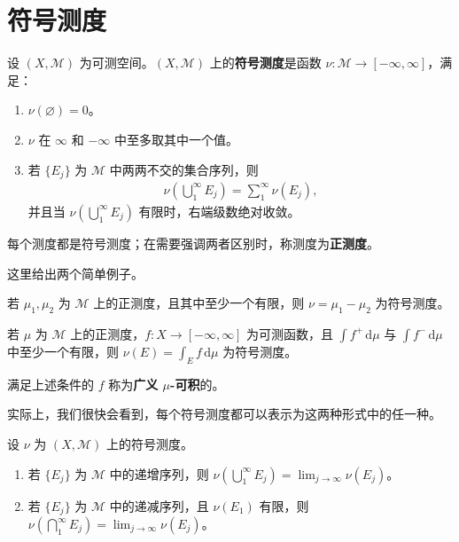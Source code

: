 \documentclass[../../main.tex]{subfiles}%
\begin{document}
\section{符号测度}\label{section:ch03-signed-measures}
\begin{definition}[符号测度]\label{definition:ch03-signed-measure}
设 $(X,\mathscr{M})$ 为可测空间。$(X,\mathscr{M})$ 上的\textbf{符号测度}是函数 $\nu:\mathscr{M}\to[-\infty,\infty]$，满足：
\begin{enumerate}
\item $\nu(\varnothing)=0$。
\item $\nu$ 在 $\infty$ 和 $-\infty$ 中至多取其中一个值。
\item 若 $\{E_j\}$ 为 $\mathscr{M}$ 中两两不交的集合序列，则
\begin{align*}
\nu\left(\bigcup_1^\infty E_j\right)=\sum_1^\infty\nu(E_j),
\end{align*}
并且当 $\nu(\bigcup_1^\infty E_j)$ 有限时，右端级数绝对收敛。
\end{enumerate}
\end{definition}
\begin{definition}[正测度]\label{definition:ch03-positive-measure}
每个测度都是符号测度；在需要强调两者区别时，称测度为\textbf{正测度}。
\end{definition}
这里给出两个简单例子。
\begin{example}\label{example:ch03-difference-measures}
若 $\mu_1,\mu_2$ 为 $\mathscr{M}$ 上的正测度，且其中至少一个有限，则 $\nu=\mu_1-\mu_2$ 为符号测度。
\end{example}
\begin{example}\label{example:ch03-signed-density}
若 $\mu$ 为 $\mathscr{M}$ 上的正测度，$f:X\to[-\infty,\infty]$ 为可测函数，且 $\int f^+\,\mathrm{d}\mu$ 与 $\int f^-\,\mathrm{d}\mu$ 中至少一个有限，则 $\nu(E)=\int_E f\,\mathrm{d}\mu$ 为符号测度。
\begin{definition*}[广义可积]
满足上述条件的 $f$ 称为\textbf{广义 $\mu$-可积}的。
\end{definition*}
\end{example}
实际上，我们很快会看到，每个符号测度都可以表示为这两种形式中的任一种。
\begin{proposition}\label{proposition:ch03-signed-continuity}
设 $\nu$ 为 $(X,\mathscr{M})$ 上的符号测度。
\begin{enumerate}
\item\label{item:ch03-signed-continuity-below} 若 $\{E_j\}$ 为 $\mathscr{M}$ 中的递增序列，则 $\nu(\bigcup_1^\infty E_j)=\lim_{j\to\infty}\nu(E_j)$。
\item\label{item:ch03-signed-continuity-above} 若 $\{E_j\}$ 为 $\mathscr{M}$ 中的递减序列，且 $\nu(E_1)$ 有限，则 $\nu(\bigcap_1^\infty E_j)=\lim_{j\to\infty}\nu(E_j)$。
\end{enumerate}
\end{proposition}
\end{document}
